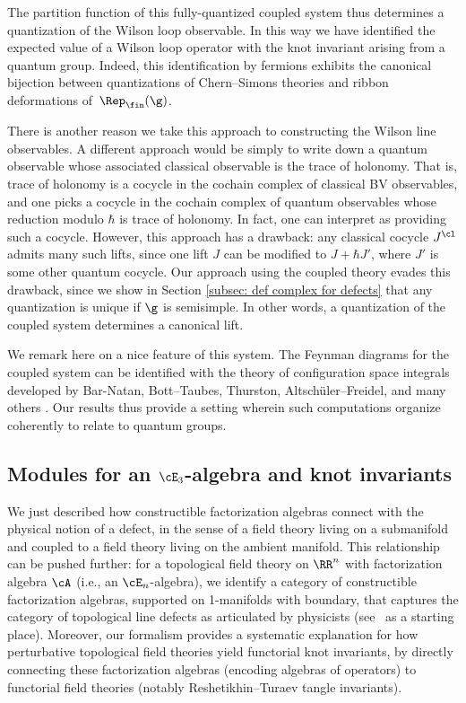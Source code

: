 \documentclass[10pt]{amsart}
\begin{document}
The partition function of this fully-quantized coupled system thus determines a quantization of the Wilson loop observable.
In this way we have identified the expected value of a Wilson loop operator with the knot invariant arising from a quantum group.
Indeed, this identification by fermions exhibits the canonical bijection between quantizations of Chern--Simons theories and ribbon deformations of~$\Rep_\fin(\g)$.

\begin{rmk}
There is another reason we take this approach to constructing the Wilson line observables.
A different approach would be simply to write down a quantum observable whose associated classical observable is the trace of holonomy.
That is, trace of holonomy is a cocycle in the cochain complex of classical BV observables,
and one picks a cocycle in the cochain complex of quantum observables whose reduction modulo $\hbar$ is trace of holonomy.
In fact, one can interpret \cite{AltFreVCS} as providing such a cocycle.
However, this approach has a drawback:
any classical cocycle $J^\cl$ admits many such lifts, 
since one lift $J$ can be modified to $J + \hbar J'$, 
where $J'$ is some other quantum cocycle.
Our approach using the coupled theory evades this drawback,
since we show in Section \ref{subsec: def complex for defects} 
that any quantization is unique if $\g$ is semisimple.
In other words, a quantization of the coupled system determines a canonical lift.
\end{rmk}

\begin{rmk}
We remark here on a nice feature of this system.
The Feynman diagrams for the coupled system can be identified with the theory of configuration space integrals developed by Bar-Natan, Bott--Taubes, Thurston, Altsch\"uler--Freidel, and many others \cite{BarVI,BotTau,Thu,AltFreVCS}.
Our results thus provide a setting wherein such computations organize coherently to relate to quantum groups.
\end{rmk}

\subsection{Modules for an $\cE_3$-algebra and knot invariants}

We just described how constructible factorization algebras connect with the physical notion of a defect, 
in the sense of a field theory living on a submanifold and coupled to a field theory living on the ambient manifold.
This relationship can be pushed further:
for a topological field theory on $\RR^n$ with factorization algebra $\cA$ (i.e., an $\cE_n$-algebra),
we identify a category of constructible factorization algebras, supported on 1-manifolds with boundary, that captures the category of topological line defects as articulated by physicists (see~\cite{KapICM, FucSch3d, FucSchTFT, KapWT} as a starting place).
Moreover, our formalism provides a systematic explanation for how perturbative topological field theories yield functorial knot invariants,
by directly connecting these factorization algebras (encoding algebras of operators) to functorial field theories (notably Reshetikhin--Turaev tangle invariants).
\end{document}
